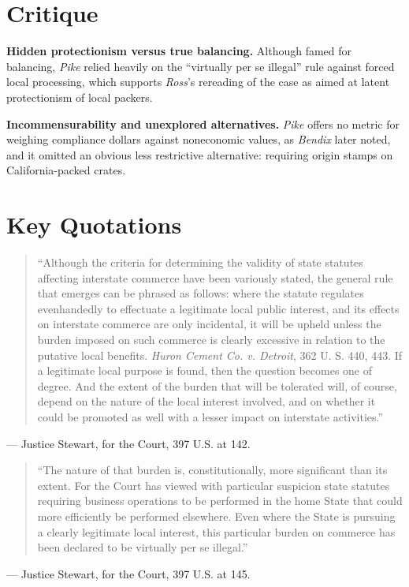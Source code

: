 \documentclass[12pt]{article}
\begin{document}
\section{Critique}

\textbf{Hidden protectionism versus true balancing.} Although famed for balancing, \textit{Pike} relied heavily on the ``virtually per se illegal'' rule against forced local processing, which supports \textit{Ross}'s rereading of the case as aimed at latent protectionism of local packers.

\textbf{Incommensurability and unexplored alternatives.} \textit{Pike} offers no metric for weighing compliance dollars against noneconomic values, as \textit{Bendix} later noted, and it omitted an obvious less restrictive alternative: requiring origin stamps on California-packed crates.

\section{Key Quotations}

\begin{quote}
``Although the criteria for determining the validity of state statutes affecting interstate commerce have been variously stated, the general rule that emerges can be phrased as follows: where the statute regulates evenhandedly to effectuate a legitimate local public interest, and its effects on interstate commerce are only incidental, it will be upheld unless the burden imposed on such commerce is clearly excessive in relation to the putative local benefits. \textit{Huron Cement Co. v. Detroit}, 362 U. S. 440, 443. If a legitimate local purpose is found, then the question becomes one of degree. And the extent of the burden that will be tolerated will, of course, depend on the nature of the local interest involved, and on whether it could be promoted as well with a lesser impact on interstate activities.''
\end{quote}
\noindent --- Justice Stewart, for the Court, 397 U.S. at 142.

\begin{quote}
``The nature of that burden is, constitutionally, more significant than its extent. For the Court has viewed with particular suspicion state statutes requiring business operations to be performed in the home State that could more efficiently be performed elsewhere. Even where the State is pursuing a clearly legitimate local interest, this particular burden on commerce has been declared to be virtually per se illegal.''
\end{quote}
\noindent --- Justice Stewart, for the Court, 397 U.S. at 145.
\end{document}
